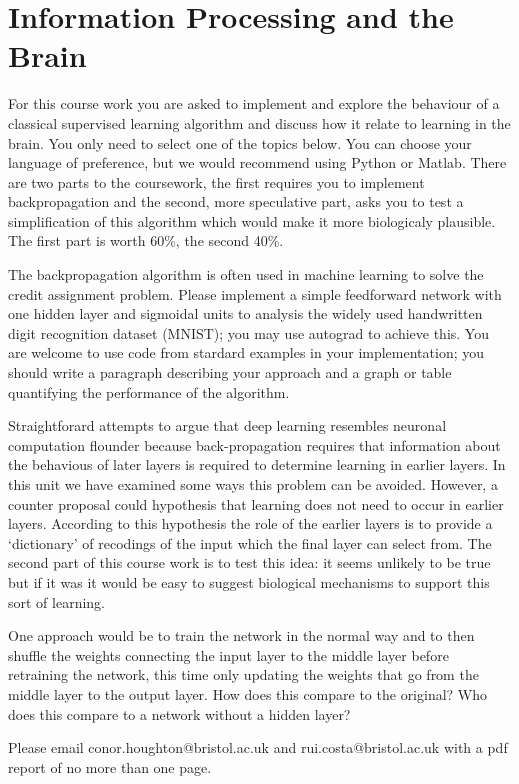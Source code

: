 \documentclass[12pt]{article}
\begin{document}
\section*{Information Processing and the Brain} 

For this course work you are asked to implement and explore the
behaviour of a classical supervised learning algorithm and discuss how
it relate to learning in the brain. You only need to select one of the
topics below​. You can choose your language of preference, but we would
recommend using Python or Matlab. There are two parts to the
coursework, the first requires you to implement backpropagation and
the second, more speculative part, asks you to test a simplification
of this algorithm which would make it more biologicaly plausible. The first part is worth 60\%, the second 40\%.

The backpropagation algorithm is often used in machine learning to
solve the credit assignment problem. Please implement a simple
feedforward network with one hidden layer and sigmoidal units to
analysis the widely used handwritten digit recognition dataset
(MNIST); you may use autograd to achieve this. You are welcome to use
code from stardard examples in your implementation; you should write a
paragraph describing your approach and a graph or table quantifying
the performance of the algorithm.

Straightforard attempts to argue that deep learning resembles neuronal
computation flounder because back-propagation requires that
information about the behavious of later layers is required to
determine learning in earlier layers. In this unit we have examined
some ways this problem can be avoided. However, a counter proposal
could hypothesis that learning does not need to occur in earlier
layers. According to this hypothesis the role of the earlier layers is
to provide a `dictionary' of recodings of the input which the final
layer can select from. The second part of this course work is to test
this idea: it seems unlikely to be true but if it was it would be easy
to suggest biological mechanisms to support this sort of learning.

One approach would be to train the network in the normal way and to
then shuffle the weights connecting the input layer to the middle
layer before retraining the network, this time only updating the
weights that go from the middle layer to the output layer. How does
this compare to the original? Who does this compare to a network
without a hidden layer?

Please email conor.houghton@bristol.ac.uk and rui.costa@bristol.ac.uk
with a pdf report of no more than one page.
\end{document}
